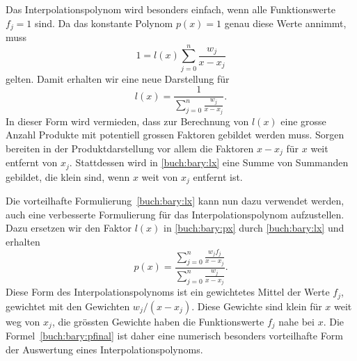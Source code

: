Das Interpolationspolynom wird besonders einfach, wenn alle Funktionswerte
$f_j=1$ sind.
Da das konstante Polynom $p(x)=1$ genau diese Werte annimmt, muss
\[
1 = l(x) \sum_{j=0}^n \frac{w_j}{x-x_j}
\]
gelten.
Damit erhalten wir eine neue Darstellung für 
\begin{equation}
l(x)
=
\frac{1}{\displaystyle\sum_{j=0}^n \frac{w_j}{x-x_j}}.
\label{buch:bary:lx}
\end{equation}
In dieser Form wird vermieden, dass zur Berechnung von $l(x)$ eine
grosse Anzahl Produkte mit potentiell grossen Faktoren gebildet werden
muss.
Sorgen bereiten in der Produktdarstellung vor allem die Faktoren
$x-x_j$ für $x$ weit entfernt von $x_j$.
Stattdessen wird in \eqref{buch:bary:lx} eine Summe von Summanden gebildet,
die klein sind,
wenn $x$ weit von $x_j$ entfernt ist.

Die vorteilhafte Formulierung~\eqref{buch:bary:lx} kann nun dazu
verwendet werden, auch eine verbesserte Formulierung für das
Interpolationspolynom aufzustellen.
Dazu ersetzen wir den Faktor $l(x)$ in \eqref{buch:bary:px}
durch \eqref{buch:bary:lx} und erhalten
\begin{equation}
p(x)
=
\frac{\displaystyle \sum_{j=0}^n \frac{w_jf_j}{x-x_j}
}{
\displaystyle\sum_{j=0}^n \frac{w_j}{x-x_j}}.
\label{buch:bary:pfinal}
\end{equation}
Diese Form des Interpolationspolynoms ist ein gewichtetes Mittel 
der Werte $f_j$, gewichtet mit den Gewichten $w_j/(x-x_j)$.
%
Diese Gewichte sind klein für $x$ weit weg von $x_j$, die grössten
Gewichte haben die Funktionswerte $f_j$ nahe bei $x$.
%
%
Die Formel~\eqref{buch:bary:pfinal} ist daher eine numerisch besonders
vorteilhafte Form der Auswertung eines Interpolationspolynoms.







